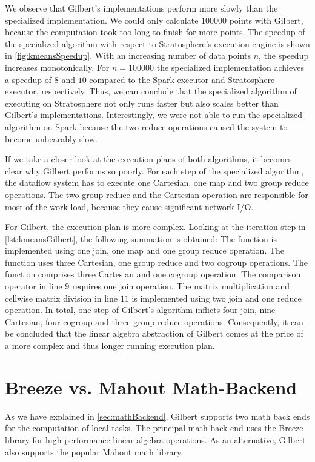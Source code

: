 We observe that Gilbert's \kmeans implementations perform more slowly than the specialized implementation.
We could only calculate $100000$ points with Gilbert, because the computation took too long to finish for more points.
The speedup of the specialized algorithm with respect to Stratosphere's execution engine is shown in \cref{fig:kmeansSpeedup}.
With an increasing number of data points $n$, the speedup increases monotonically.
For $n=100000$ the specialized implementation achieves a speedup of $8$ and $10$ compared to the Spark executor and Stratosphere executor, respectively.
Thus, we can conclude that the specialized algorithm of \kmeans executing on Stratosphere not only runs faster but also scales better than Gilbert's implementations.
Interestingly, we were not able to run the specialized algorithm on Spark because the two reduce operations caused the system to become unbearably slow.

If we take a closer look at the execution plans of both algorithms, it becomes clear why Gilbert performs so poorly.
For each step of the specialized algorithm, the dataflow system has to execute one Cartesian, one map and two group reduce operations.
The two group reduce and the Cartesian operation are responsible for most of the work load, because they cause significant network I/O.

For Gilbert, the execution plan is more complex.
Looking at the iteration step in \cref{lst:kmeansGilbert}, the following summation is obtained:
The  function is implemented using one join, one map and one group reduce operation.
The  function uses three Cartesian, one group reduce and two cogroup operations.
The  function comprises three Cartesian and one cogroup operation.
The comparison operator in line $9$ requires one join operation.
The matrix multiplication and cellwise matrix division in line $11$ is implemented using two join and one reduce operation.
In total, one step of Gilbert's \kmeans algorithm inflicts four join, nine Cartesian, four cogroup and three group reduce operations.
Consequently, it can be concluded that the linear algebra abstraction of Gilbert comes at the price of a more complex and thus longer running execution plan.

\section{Breeze vs. Mahout Math-Backend}

As we have explained in \cref{sec:mathBackend}, Gilbert supports two math back ends for the computation of local tasks.
The principal math back end uses the Breeze library for high performance linear algebra operations.
As an alternative, Gilbert also supports the popular Mahout math library.

